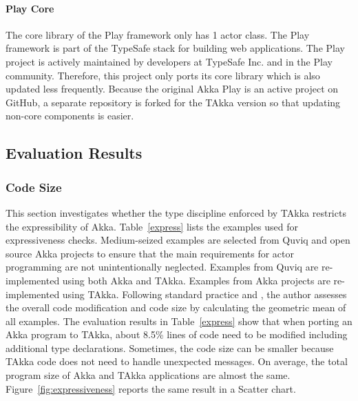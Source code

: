 \paragraph{Play Core} The core library of the Play framework only has 1 actor 
class.  The Play framework \citep{play_doc} is part of the TypeSafe stack for 
building web applications.  The Play project is actively maintained by 
developers at TypeSafe Inc. and in the Play community.  Therefore, this project 
only ports its core library which is also updated less frequently.
Because the original Akka Play is an active project on GitHub, a separate repository is 
forked for the TAkka version \citep{takka_play} so that updating non-core components is easier.





\subsection{Evaluation Results}
\label{results}

\subsubsection{Code Size}

This section investigates whether the type discipline enforced by TAkka restricts the 
expressibility of Akka.  Table~\ref{express} lists the examples used for expressiveness checks.  
Medium-seized examples are selected from Quviq \citep{quviq}
and open source Akka projects to ensure that the main requirements for actor 
programming are not unintentionally neglected.  Examples from 
Quviq are re-implemented using both Akka and TAkka.  Examples from 
Akka projects are re-implemented using TAkka.  Following standard practice \citet{Fleming} and \citet{HePa06},  
the author assesses the overall code modification and code 
size by calculating the geometric mean of all examples. The evaluation results 
in Table~\ref{express} show that when porting an Akka program to TAkka, about 
8.5\% lines of code need to be modified including additional type declarations. 
Sometimes, the code size can be smaller because TAkka code does not 
need to handle unexpected messages.  On average, the total program size 
of Akka and TAkka applications are almost the same.  Figure~\ref{fig:expressiveness}
reports the same result in a Scatter chart.




